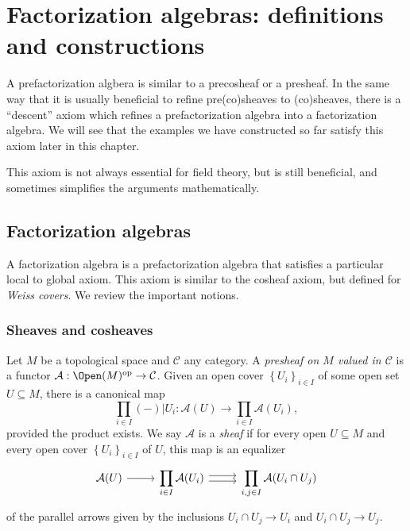 \chapter{Factorization algebras: definitions and constructions}

A prefactorization algbera is similar to a precosheaf or a presheaf. In the same way that it is usually beneficial to refine pre(co)sheaves to (co)sheaves, there is a ``descent'' axiom which refines a prefactorization algebra into a factorization algebra. We will see that the examples we have constructed so far satisfy this axiom later in this chapter.

This axiom is not always essential for field theory, but is still beneficial, and sometimes simplifies the arguments mathematically.

\section{Factorization algebras}

A factorization algebra is a prefactorization algebra that satisfies a particular local to global axiom. This axiom is similar to the cosheaf axiom, but defined for \emph{Weiss covers}. We review the important notions.

\subsection{Sheaves and cosheaves}

\begin{definition}\label{dfn:6-1-1}
	Let $M$ be a topological space and $\mathcal{C} $ any category. A \emph{presheaf on $M$ valued in $\mathcal{C} $}  is a functor $\mathcal{A} : \Open(M) ^{\mathrm{op}}  \to \mathcal{C} $. Given an open cover $\left\{ U_i \right\} _{i\in I} $ of some open set $U\subseteq M$, there is a canonical map
	\[
		\prod_{i\in I} (-)|U_i : \mathcal{A} (U) \to \prod_{i\in I} \mathcal{A} (U_i)
	,\]
	provided the product exists. We say $\mathcal{A} $ is a \emph{sheaf} if for every open $U\subseteq M$ and every open cover $\left\{ U_i \right\} _{i\in I} $ of $U$, this map is an equalizer
	\[\begin{tikzcd}[row sep = 2.5em, column sep = 2.5em]
		\mathcal{A} (U) \ar[r]  & \displaystyle{\prod_{i\in I} \mathcal{A} (U_i)}\ar[shift left, r] \ar[shift right, r]  & \displaystyle{\prod_{i,j\in I} \mathcal{A} (U_i \cap U_j)}
	\end{tikzcd}\]
	of the parallel arrows given by the inclusions $U_i \cap U_j \to U_i$ and $U_i \cap U_j \to U_j$.
\end{definition}

